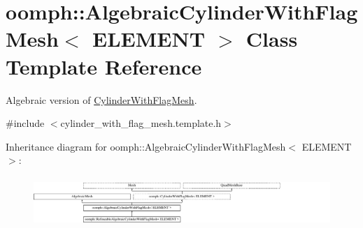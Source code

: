 \hypertarget{classoomph_1_1AlgebraicCylinderWithFlagMesh}{}\section{oomph\+:\+:Algebraic\+Cylinder\+With\+Flag\+Mesh$<$ E\+L\+E\+M\+E\+NT $>$ Class Template Reference}
\label{classoomph_1_1AlgebraicCylinderWithFlagMesh}


Algebraic version of \hyperlink{classoomph_1_1CylinderWithFlagMesh}{Cylinder\+With\+Flag\+Mesh}.  




{\ttfamily \#include $<$cylinder\+\_\+with\+\_\+flag\+\_\+mesh.\+template.\+h$>$}

Inheritance diagram for oomph\+:\+:Algebraic\+Cylinder\+With\+Flag\+Mesh$<$ E\+L\+E\+M\+E\+NT $>$\+:\begin{figure}[H]
\begin{center}
\leavevmode
\includegraphics[height=1.924399cm]{classoomph_1_1AlgebraicCylinderWithFlagMesh}
\end{center}
\end{figure}
